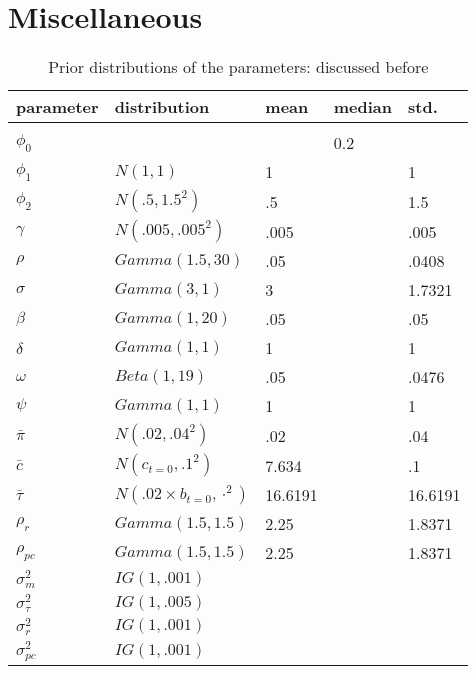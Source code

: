 \documentclass[12pt,reqno,oneside]{amsart}
\theoremstyle{definition}
\theoremstyle{remark}
\begin{document}
\section{Miscellaneous}

\pagebreak
\begin{table}[b]
\caption{Prior distributions of the parameters: discussed before}\label{tbl:prior1}
\begin{tabular}{lllll}
\hline
parameter           & distribution          & mean      & median    & std. \\
\hline \\
$\phi_0$            &                       &           & 0.2       &        \\
$\phi_1$            & $N(1,1)$              & 1         &           & 1      \\
$\phi_2$            & $N(.5,1.5^2)$         & .5        &           & 1.5    \\
$\gamma$            & $N(.005,.005^2)$      & .005      &           & .005   \\
$\rho$              & $Gamma(1.5,30)$       & .05       &           & .0408  \\
$\sigma$            & $Gamma(3,1)$          & 3         &           & 1.7321 \\
$\beta$             & $Gamma(1,20)$         & .05       &           & .05    \\
$\delta$            & $Gamma(1,1)$          & 1         &           & 1      \\
$\omega$            & $Beta(1,19)$          & .05       &           & .0476  \\
$\psi$              & $Gamma(1,1)$          & 1         &           & 1      \\
$\bar\pi$           & $N(.02,.04^2)$        & .02       &           & .04    \\
$\bar c$            & $N(c_{t=0},.1^2)$     & 7.634     &           & .1     \\
$\bar\tau$          & $N(.02\times b_{t=0},\cdot^2)$       & 16.6191   &           & 16.6191   \\
$\rho_r$            & $Gamma(1.5,1.5)$      & 2.25      &           & 1.8371 \\
$\rho_{pc}$         & $Gamma(1.5,1.5)$      & 2.25      &           & 1.8371 \\
$\sigma^2_m$        & $IG(1,.001)$          &           &           &        \\
$\sigma^2_\tau$     & $IG(1,.005)$          &           &           &        \\
$\sigma^2_r$        & $IG(1,.001)$          &           &           &        \\
$\sigma^2_{pc}$     & $IG(1,.001)$          &           &           &        \\
\hline
\end{tabular}
\end{table}
\pagebreak
\end{document}
